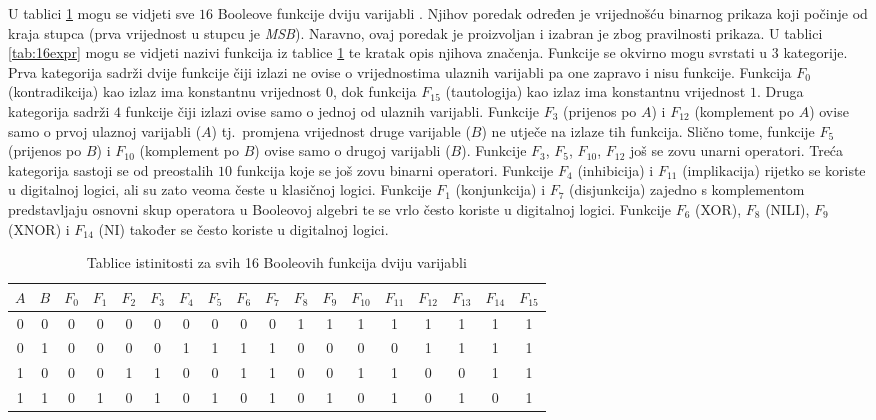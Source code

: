 \documentclass[times, utf8, diplomski]{fer}
\begin{document}
U tablici \ref{tab:16funcs} mogu se vidjeti sve $16$ Booleove funkcije dviju varijabli \cite{book:digitalDesign}. Njihov poredak određen je vrijednošću binarnog prikaza koji počinje od kraja stupca (prva vrijednost u stupcu je \textit{MSB}). Naravno, ovaj poredak je proizvoljan i izabran je zbog pravilnosti prikaza. U tablici \ref{tab:16expr} mogu se vidjeti nazivi funkcija iz tablice \ref{tab:16funcs} te kratak opis njihova značenja. Funkcije se okvirno mogu svrstati u $3$ kategorije. Prva kategorija sadrži dvije funkcije čiji izlazi ne ovise o vrijednostima ulaznih varijabli pa one zapravo i nisu funkcije. Funkcija $F_{0}$ (kontradikcija) kao izlaz ima konstantnu vrijednost $0$, dok funkcija $F_{15}$ (tautologija) kao izlaz ima konstantnu vrijednost $1$. Druga kategorija sadrži $4$ funkcije čiji izlazi ovise samo o jednoj od ulaznih varijabli. Funkcije $F_{3}$ (prijenos po $A$) i $F_{12}$ (komplement po $A$) ovise samo o prvoj ulaznoj varijabli ($A$) tj.~promjena vrijednost druge varijable ($B$) ne utječe na izlaze tih funkcija. Slično tome, funkcije $F_{5}$ (prijenos po $B$) i $F_{10}$ (komplement po $B$) ovise samo o drugoj varijabli ($B$). Funkcije $F_{3}$, $F_{5}$, $F_{10}$, $F_{12}$ još se zovu unarni operatori. Treća kategorija sastoji se od preostalih $10$ funkcija koje se još zovu binarni operatori. Funkcije $F_{4}$ (inhibicija) i $F_{11}$ (implikacija) rijetko se koriste u digitalnoj logici, ali su zato veoma česte u klasičnoj logici. Funkcije $F_{1}$ (konjunkcija) i $F_{7}$ (disjunkcija) zajedno s komplementom predstavljaju osnovni skup operatora u Booleovoj algebri te se vrlo često koriste u digitalnoj logici. Funkcije $F_{6}$ (XOR), $F_{8}$ (NILI), $F_{9}$ (XNOR) i $F_{14}$ (NI) također se često koriste u digitalnoj logici.

\begin{table}[htb]
	\centering
	\caption{Tablice istinitosti za svih 16 Booleovih funkcija dviju varijabli}
	\label{tab:16funcs}
	\begin{tabular}{|cc|cccccccccccccccc|}
		\hline
		$A$ & $B$ & $F_{0}$ & $F_{1}$ & $F_{2}$ & $F_{3}$ & $F_{4}$ & $F_{5}$ & $F_{6}$ & $F_{7}$ & $F_{8}$ & $F_{9}$ & $F_{10}$ & $F_{11}$ & $F_{12}$ & $F_{13}$ & $F_{14}$ & $F_{15}$ \\
		\hline
		0 & 0 & 0 & 0 & 0 & 0 & 0 & 0 & 0 & 0 & 1 & 1 & 1 & 1 & 1 & 1 & 1 & 1 \\
		0 & 1 & 0 & 0 & 0 & 0 & 1 & 1 & 1 & 1 & 0 & 0 & 0 & 0 & 1 & 1 & 1 & 1 \\
		1 & 0 & 0 & 0 & 1 & 1 & 0 & 0 & 1 & 1 & 0 & 0 & 1 & 1 & 0 & 0 & 1 & 1 \\
		1 & 1 & 0 & 1 & 0 & 1 & 0 & 1 & 0 & 1 & 0 & 1 & 0 & 1 & 0 & 1 & 0 & 1 \\
		\hline
	\end{tabular}
\end{table}
\end{document}
